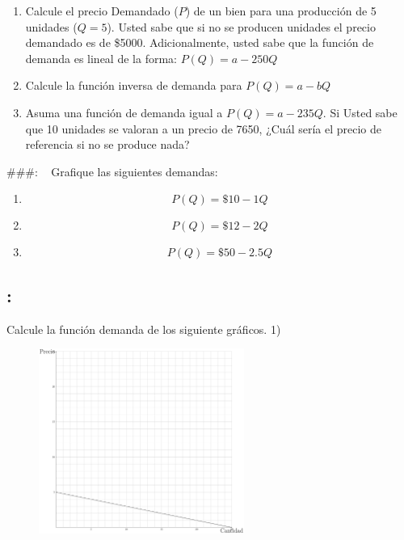 \documentclass[
  letterpaper,
  DIV=11,
  numbers=noendperiod]{scrreport}
\begin{document}
\begin{enumerate}
\def\labelenumi{\arabic{enumi})}
\item
  Calcule el precio Demandado (\(P\)) de un bien para una producción de
  5 unidades (\(Q=5\)). Usted sabe que si no se producen unidades el
  precio demandado es de \$5000. Adicionalmente, usted sabe que la
  función de demanda es lineal de la forma: \(P(Q)=a-250Q\)
\item
  Calcule la función inversa de demanda para \(P(Q)=a-bQ\)
\item
  Asuma una función de demanda igual a \(P(Q)=a-235Q\). Si Usted sabe
  que 10 unidades se valoran a un precio de 7650, ¿Cuál sería el precio
  de referencia si no se produce nada?
\end{enumerate}

\#\#\#: ~ Grafique las siguientes demandas:

\begin{enumerate}
\def\labelenumi{\arabic{enumi})}
\item
  \[
  P(Q)=\$10 - 1Q
  \]
\item
  \[
  P(Q)=\$12 - 2Q
  \]
\item
  \[
  P(Q)=\$50 - 2.5Q
  \]
\end{enumerate}

\newpage

\hypertarget{section-5}{%
\subsection{:}\label{section-5}}

Calcule la función demanda de los siguiente gráficos. 1)

\begin{figure}

{\centering \includegraphics[width=0.6\textwidth,height=\textheight]{7ej_propuestos_files/figure-pdf/unnamed-chunk-1-1.pdf}

}

\end{figure}
\end{document}
